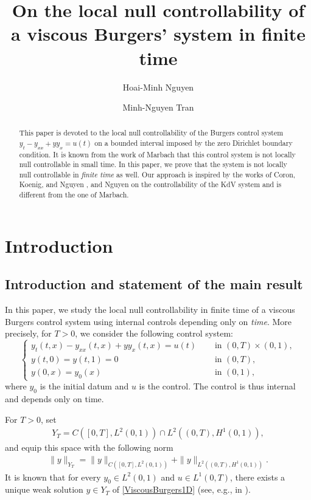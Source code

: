 \documentclass[11pt, reqno]{amsart}
\title{On the local null controllability of a viscous Burgers' system in finite time}
\author[H.-M. Nguyen]{Hoai-Minh Nguyen}
\author[M.-N. Tran]{Minh-Nguyen Tran}
\theoremstyle{plain}
\numberwithin{equation}{section}
\newcommand{\be}{\begin{equation}}
\newcommand{\ee}{\end{equation}}
\begin{document}
\begin{abstract}
This paper is devoted to the local null controllability of the Burgers control system $y_t - y_{xx} + y y_x = u(t)$ on a bounded interval imposed by the zero Dirichlet boundary condition. It is known from the work of Marbach \cite{Marbach18} that this control system is not locally null controllable in small time. In this paper, we prove that the system is not locally null controllable in {\it finite time} as well. Our approach is inspired by the works of Coron, Koenig, and Nguyen \cite{Coron-Koenig-Nguyen}, and Nguyen \cite{Nguyen} on the controllability of the KdV system and is different from the one of Marbach. 
\end{abstract}




\maketitle

\tableofcontents

\section{Introduction}

\subsection{Introduction and statement of the main result}

In this paper, we study the local null controllability in finite time of a viscous Burgers control system using internal controls depending only on {\it time}. More precisely, for $T > 0$, we consider the following control system:
        \be
        \begin{cases}   \label{ViscousBurgers1D}
            y_t (t, x) - y_{xx} (t, x) + y y_x (t, x)= u(t) \quad &\text{ in } (0, T) \times (0, 1), \\[5pt]
            y(t, 0) = y(t, 1) = 0 &\text{ in } (0, T), \\[5pt]
            y(0, x) = y_0(x) &\text{ in } (0, 1),
        \end{cases}
        \ee
where $y_0$ is the initial datum and $u$ is the control. The control is thus internal and depends only on time. 

For $T>0$, set 
\begin{align}   \label{YT}
Y_T = C([0, T], L^2(0, 1)) \cap L^2((0, T), H^1(0, 1)),
\end{align}
and equip this space with the following norm 
\begin{align}	\label{norm-YT}
\| y \|_{Y_T} = \| y \|_{C([0, T], L^2(0, 1))} + \| y\|_{L^2((0, T), H^1(0, 1))}.
\end{align}
It is known that for every $y_0 \in L^2(0, 1)$ and $u \in L^1(0, T)$, there exists a unique weak solution $y \in Y_T$ of \eqref{ViscousBurgers1D} (see, e.g.,  in ). 
\end{document}
